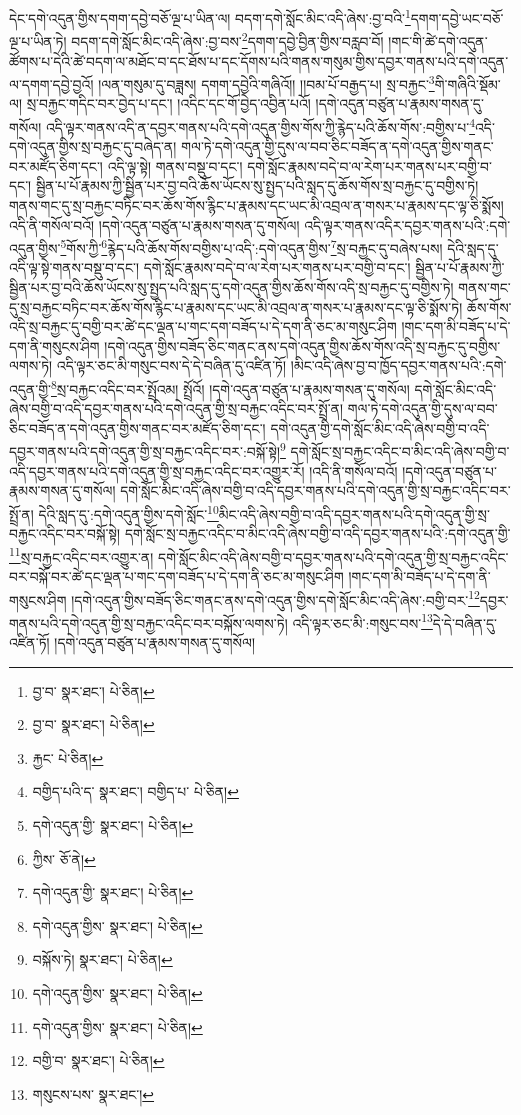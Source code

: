 དེང་དགེ་འདུན་གྱིས་དགག་དབྱེ་བཅོ་ལྔ་པ་ཡིན་ལ། བདག་དགེ་སློང་མིང་འདི་ཞེས་:བྱ་བའི་\footnote{བྱ་བ་  སྣར་ཐང་།  པེ་ཅིན། }དགག་དབྱེ་ཡང་བཅོ་ལྔ་པ་ཡིན་ཏེ། བདག་དགེ་སློང་མིང་འདི་ཞེས་:བྱ་བས་\footnote{བྱ་བ་  སྣར་ཐང་།  པེ་ཅིན། }དགག་དབྱེ་བྱིན་གྱིས་བརླབ་བོ། །གང་གི་ཚེ་དགེ་འདུན་ཚོགས་པ་དེའི་ཚེ་བདག་ལ་མཐོང་བ་དང་ཐོས་པ་དང་དོགས་པའི་གནས་གསུམ་གྱིས་དབྱར་གནས་པའི་དགེ་འདུན་ལ་དགག་དབྱེ་བྱའོ། །ལན་གསུམ་དུ་བཟླས། དགག་དབྱེའི་གཞིའོ།། །།བམ་པོ་བརྒྱད་པ། སྲ་བརྐྱང་\footnote{རྐྱང་  པེ་ཅིན། }གི་གཞིའི་སྡོམ་ལ། སྲ་བརྐྱང་གདིང་བར་བྱེད་པ་དང་། །འདིང་དང་གོ་བྱེད་འབྱིན་པའོ། །དགེ་འདུན་བཙུན་པ་རྣམས་གསན་དུ་གསོལ། འདི་ལྟར་གནས་འདི་ན་དབྱར་གནས་པའི་དགེ་འདུན་གྱིས་གོས་ཀྱི་རྙེད་པའི་ཆོས་གོས་:བགྱིས་པ་\footnote{བགྱིད་པའི་ད་  སྣར་ཐང་། བགྱིད་པ་  པེ་ཅིན། }འདི་དགེ་འདུན་གྱིས་སྲ་བརྐྱང་དུ་བཞེད་ན། གལ་ཏེ་དགེ་འདུན་གྱི་དུས་ལ་བབ་ཅིང་བཟོད་ན་དགེ་འདུན་གྱིས་གནང་བར་མཛོད་ཅིག་དང་། འདི་ལྟ་སྟེ། གནས་བསྡུ་བ་དང་། དགེ་སློང་རྣམས་བདེ་བ་ལ་རེག་པར་གནས་པར་བགྱི་བ་དང་། སྦྱིན་པ་པོ་རྣམས་ཀྱི་སྦྱིན་པར་བྱ་བའི་ཆོས་ཡོངས་སུ་སྤྱད་པའི་སླད་དུ་ཆོས་གོས་སྲ་བརྐྱང་དུ་བགྱིས་ཏེ། གནས་གང་དུ་སྲ་བརྐྱང་བཏིང་བར་ཆོས་གོས་རྙིང་པ་རྣམས་དང་ཡང་མི་འབྲལ་ན་གསར་པ་རྣམས་དང་ལྟ་ཅི་སྨོས། འདི་ནི་གསོལ་བའོ། །དགེ་འདུན་བཙུན་པ་རྣམས་གསན་དུ་གསོལ། འདི་ལྟར་གནས་འདིར་དབྱར་གནས་པའི་:དགེ་འདུན་གྱིས་\footnote{དགེ་འདུན་གྱི་  སྣར་ཐང་།  པེ་ཅིན། }གོས་ཀྱི་\footnote{ཀྱིས་  ཅོ་ནེ། }རྙེད་པའི་ཆོས་གོས་བགྱིས་པ་འདི་:དགེ་འདུན་གྱིས་\footnote{དགེ་འདུན་གྱི་  སྣར་ཐང་།  པེ་ཅིན། }སྲ་བརྐྱང་དུ་བཞེས་པས། དེའི་སླད་དུ་འདི་ལྟ་སྟེ་གནས་བསྡུ་བ་དང་། དགེ་སློང་རྣམས་བདེ་བ་ལ་རེག་པར་གནས་པར་བགྱི་བ་དང་། སྦྱིན་པ་པོ་རྣམས་ཀྱི་སྦྱིན་པར་བྱ་བའི་ཆོས་ཡོངས་སུ་སྤྱད་པའི་སླད་དུ་དགེ་འདུན་གྱིས་ཆོས་གོས་འདི་སྲ་བརྐྱང་དུ་བགྱིས་ཏེ། གནས་གང་དུ་སྲ་བརྐྱང་བཏིང་བར་ཆོས་གོས་རྙིང་པ་རྣམས་དང་ཡང་མི་འབྲལ་ན་གསར་པ་རྣམས་དང་ལྟ་ཅི་སྨོས་ཏེ། ཆོས་གོས་འདི་སྲ་བརྐྱང་དུ་བགྱི་བར་ཚེ་དང་ལྡན་པ་གང་དག་བཟོད་པ་དེ་དག་ནི་ཅང་མ་གསུང་ཤིག །གང་དག་མི་བཟོད་པ་དེ་དག་ནི་གསུངས་ཤིག །དགེ་འདུན་གྱིས་བཟོད་ཅིང་གནང་ནས་དགེ་འདུན་གྱིས་ཆོས་གོས་འདི་སྲ་བརྐྱང་དུ་བགྱིས་ལགས་ཏེ། འདི་ལྟར་ཅང་མི་གསུང་བས་དེ་དེ་བཞིན་དུ་འཛིན་ཏོ། །མིང་འདི་ཞེས་བྱ་བ་ཁྱོད་དབྱར་གནས་པའི་:དགེ་འདུན་གྱི་\footnote{དགེ་འདུན་གྱིས་  སྣར་ཐང་།  པེ་ཅིན། }སྲ་བརྐྱང་འདིང་བར་སྤྲོའམ། སྤྲོའོ། །དགེ་འདུན་བཙུན་པ་རྣམས་གསན་དུ་གསོལ། དགེ་སློང་མིང་འདི་ཞེས་བགྱི་བ་འདི་དབྱར་གནས་པའི་དགེ་འདུན་གྱི་སྲ་བརྐྱང་འདིང་བར་སྤྲོ་ན། གལ་ཏེ་དགེ་འདུན་གྱི་དུས་ལ་བབ་ཅིང་བཟོད་ན་དགེ་འདུན་གྱིས་གནང་བར་མཛོད་ཅིག་དང་། དགེ་འདུན་གྱི་དགེ་སློང་མིང་འདི་ཞེས་བགྱི་བ་འདི་དབྱར་གནས་པའི་དགེ་འདུན་གྱི་སྲ་བརྐྱང་འདིང་བར་:བསྐོ་སྟེ།\footnote{བསྐོས་ཏེ།  སྣར་ཐང་།  པེ་ཅིན། } དགེ་སློང་སྲ་བརྐྱང་འདིང་བ་མིང་འདི་ཞེས་བགྱི་བ་འདི་དབྱར་གནས་པའི་དགེ་འདུན་གྱི་སྲ་བརྐྱང་འདིང་བར་འགྱུར་རོ། །འདི་ནི་གསོལ་བའོ། །དགེ་འདུན་བཙུན་པ་རྣམས་གསན་དུ་གསོལ། དགེ་སློང་མིང་འདི་ཞེས་བགྱི་བ་འདི་དབྱར་གནས་པའི་དགེ་འདུན་གྱི་སྲ་བརྐྱང་འདིང་བར་སྤྲོ་ན། དེའི་སླད་དུ་:དགེ་འདུན་གྱིས་དགེ་སློང་\footnote{དགེ་འདུན་གྱིས་  སྣར་ཐང་།  པེ་ཅིན། }མིང་འདི་ཞེས་བགྱི་བ་འདི་དབྱར་གནས་པའི་དགེ་འདུན་གྱི་སྲ་བརྐྱང་འདིང་བར་བསྐོ་སྟེ། དགེ་སློང་སྲ་བརྐྱང་འདིང་བ་མིང་འདི་ཞེས་བགྱི་བ་འདི་དབྱར་གནས་པའི་:དགེ་འདུན་གྱི་\footnote{དགེ་འདུན་གྱིས་  སྣར་ཐང་།  པེ་ཅིན། }སྲ་བརྐྱང་འདིང་བར་འགྱུར་ན། དགེ་སློང་མིང་འདི་ཞེས་བགྱི་བ་དབྱར་གནས་པའི་དགེ་འདུན་གྱི་སྲ་བརྐྱང་འདིང་བར་བསྐོ་བར་ཚེ་དང་ལྡན་པ་གང་དག་བཟོད་པ་དེ་དག་ནི་ཅང་མ་གསུང་ཤིག །གང་དག་མི་བཟོད་པ་དེ་དག་ནི་གསུངས་ཤིག །དགེ་འདུན་གྱིས་བཟོད་ཅིང་གནང་ནས་དགེ་འདུན་གྱིས་དགེ་སློང་མིང་འདི་ཞེས་:བགྱི་བར་\footnote{བགྱི་བ་  སྣར་ཐང་།  པེ་ཅིན། }དབྱར་གནས་པའི་དགེ་འདུན་གྱི་སྲ་བརྐྱང་འདིང་བར་བསྐོས་ལགས་ཏེ། འདི་ལྟར་ཅང་མི་:གསུང་བས་\footnote{གསུངས་པས་  སྣར་ཐང་། }དེ་དེ་བཞིན་དུ་འཛིན་ཏོ། །དགེ་འདུན་བཙུན་པ་རྣམས་གསན་དུ་གསོལ། 